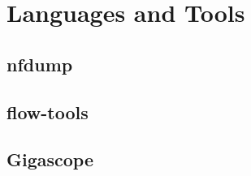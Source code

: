 \chapter{Languages and Tools}\label{ch:languages-and-tools}

\section{nfdump}\label{sec:nfdump}
\section{flow-tools}\label{sec:flow-tools}
\section{Gigascope}\label{sec:gigascope}